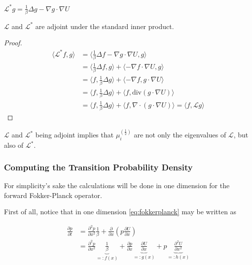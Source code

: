 \begin{definition}\label{def:bFPO}
$\mathcal{L}^*g = \frac{1}{\beta}\Delta g - \nabla g \cdot\nabla U$
\end{definition}

\begin{lemma}\label{thm:fFPadjointTobFP}
$\mathcal{L}$ and $\mathcal{L}^*$ are adjoint under the standard inner product.
\end{lemma}
\begin{proof}
\begin{equation*}\begin{aligned}
\langle \mathcal{L}^*f, g \rangle
&= \langle \frac{1}{\beta}\Delta f - \nabla g \cdot \nabla U, g \rangle\\
&= \langle \frac{1}{\beta}\Delta f, g \rangle + \langle -\nabla f \cdot \nabla U, g \rangle \\
&= \langle f, \frac{1}{\beta}\Delta g \rangle + \langle -\nabla f, g\cdot \nabla U \rangle \\
&= \langle f, \frac{1}{\beta}\Delta g \rangle + \langle f, \text{div}(g\cdot \nabla U) \rangle \\
&= \langle f, \frac{1}{\beta}\Delta g \rangle + \langle f, \nabla\cdot(g\cdot \nabla U) \rangle = \langle f, \mathcal{L}g \rangle
\end{aligned}\end{equation*}
\end{proof}

$\mathcal{L}$ and $\mathcal{L}^*$ being adjoint implies that $\mu_i^{(\frac{1}{2})}$ are not only the eigenvalues of $\mathcal{L}$, but also of $\mathcal{L}^*$.

\subsubsection{Computing the Transition Probability Density}
For simplicity's sake the calculations will be done in one dimension for the forward Fokker-Planck operator.

First of all, notice that in one dimension \eqref{eq:fokkerplanck} may be written as

\begin{equation}\label{eq:fFP1D}\begin{aligned}
\frac{\partial p}{\partial t} &= \frac{\partial^2 p}{\partial x^2}\frac{1}{\beta} + \frac{\partial}{\partial x}\left(p \frac{\partial U}{\partial x} \right)\\
&=\frac{\partial^2 p}{\partial x^2}\underbrace{\frac{1}{\beta}}_{=:f(x)} + \frac{\partial p}{\partial x}\underbrace{\frac{\partial U}{\partial x}}_{=:g(x)} + p\underbrace{\frac{\partial^2 U}{\partial x^2}}_{=:h(x)}
\end{aligned}\end{equation}

